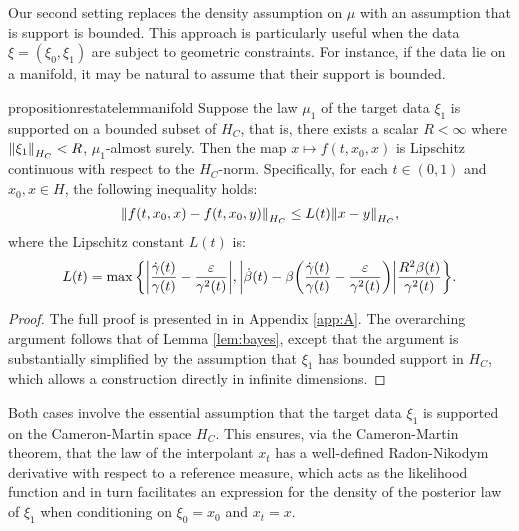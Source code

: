 Our second setting replaces the density assumption on \(\mu\) with an assumption that is support is bounded. This approach is particularly useful when the data \(\xi = (\xi_{0}, \xi_{1})\) are subject to geometric constraints. For instance, if the data lie on a manifold, it may be natural to assume that their support is bounded.







\begin{restatable}{proposition}{restatelemmanifold}\label{lem:manifold}
  Suppose the law \(\mu_{1}\) of the target data \(\xi_{1}\) is supported on a bounded subset of \(H_{C}\), that is, there exists a scalar \(R < \infty\) where \(\norm{\xi_{1}}_{H_{C}} < R\), \(\mu_{1}\)-almost surely. Then the map \(x \mapsto f(t, x_{0}, x)\) is Lipschitz continuous with respect to the \(H_{C}\)-norm. Specifically, for each \(t \in (0, 1)\) and \(x_{0}, x \in H\), the following inequality holds:
  \[
    \norm{f(t, x_{0}, x) - f(t, x_{0}, y)}_{H_{C}} \leq L(t) \norm{x - y}_{H_{C}},
  \]
  where the Lipschitz constant \(L(t)\) is:
  \[
    L(t) =  \mathop{\underset{}{\max}}\qty{\abs{\frac{\dot{\gamma}(t)}{\gamma(t)} - \frac{\varepsilon}{\gamma^{2}(t)}}, \abs{\dot{\beta}(t) - \beta\qty(\frac{\dot{\gamma}(t)}{\gamma(t)} - \frac{\varepsilon}{\gamma^{2}(t)})} \frac{R^{2} \beta(t)}{\gamma^{2}(t)}}.
  \]
\end{restatable}
\begin{proof}
  The full proof is presented in  in Appendix \ref{app:A}. The overarching argument follows that of Lemma \ref{lem:bayes}, except that the argument is substantially simplified by the assumption that \(\xi_{1}\) has bounded support in \(H_{C}\), which allows a construction directly in infinite dimensions.
\end{proof}

Both cases involve the essential assumption that the target data \(\xi_{1}\) is supported on the Cameron-Martin space \(H_{C}\). This ensures, via the Cameron-Martin theorem, that the law of the interpolant \(x_{t}\) has a well-defined Radon-Nikodym derivative with respect to a reference measure, which acts as the likelihood function and in turn facilitates an expression for the density of the posterior law of \(\xi_{1}\) when conditioning on \(\xi_{0}=x_{0}\) and \(x_{t}=x\).

